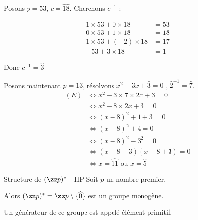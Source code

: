 \begin{exemple}
    Posons $p = 53$, $c = \widehat{18}$. Cherchons $c^{-1}$ :
    \begin{center}
    \begin{align*}
        1 \times 53 + 0 \times 18 &= 53 \\
        0 \times 53 + 1 \times 18 &= 18 \\
        1 \times 53 + (-2) \times 18 &= 17 \\
        - 53 + 3 \times 18 &= 1 
    \end{align*}
    \end{center}
    Donc $c^{-1} = \widehat{3} $

    \lvspace Posons maintenant $p = 13$, résolvons $x^2 - 3x + \widehat 3 = 0$
    , $\widehat 2^{-1} = \widehat 7$. 
    \begin{align*}
        (E) & \iff x^2 - 3 \times 7 \times 2x + 3 = 0 \\
        & \iff x^2 - 8 \times 2x + 3 = 0 \\
        & \iff (x - 8)^2 + 1 + 3 = 0 \\
        & \iff (x - 8)^2 + 4 = 0 \\
        & \iff (x - 8)^2 - 3^2 = 0 \\
        & \iff (x - 8 - 3)(x - 8 + 3) = 0 \\
        & \iff x = \widehat {11} \text{ ou } x = \widehat {5}
    \end{align*}
\end{exemple}

\begin{theoreme}{Structure de $(\zz p)^*$ - HP}{}
    Soit $p$ un nombre premier. 

    Alors $(\zz p)^* = \zz p \setminus \{\widehat 0\}$ est un groupe monogène. 

    Un générateur de ce groupe est appelé élément primitif. 
\end{theoreme}

